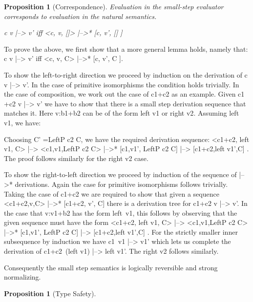 \documentclass[preprint]{sigplanconf}
\newtheorem{proposition}[theorem]{Proposition}
\newenvironment{proof}[1][Proof.]{\begin{trivlist}\item[\hskip \labelsep {\bfseries #1}]}{\end{trivlist}}
\begin{document}
\begin{proposition}[Correspondence]
  Evaluation in the small-step evaluator corresponds to evaluation in
  the natural semantics.

  {{c v |--> v'}} iff {{<c, v, []> |-->* [c, v', [] ]}}
\end{proposition}
\begin{proof}
  To prove the above, we first show that a more general lemma holds,
  namely that: {{c v |--> v'}} iff {{<c, v, C> |-->* [c, v', C ]}}.

  To show the left-to-right direction we proceed by induction on the
  derivation of {{c v |--> v'}}. In the case of primitive isomorphisms
  the condition holds trivially. In the case of composition, we work
  out the case of {{c1+c2}} as an example. Given {{c1 +c2 v |--> v'}}
  we have to show that there is a small step derivation sequence that
  matches it. Here {{v:b1+b2}} can be of the form {{left v1}} or
  {{right v2}}. Assuming {{left v1}}, we have: 


Choosing {{C' =LeftP c2 C}}, we have the required derivation sequence: 
{{ <c1+c2, left v1, C> |--> <c1,v1,LeftP c2 C> |-->* {[c1,v1', LeftP c2 C]} |--> {[c1+c2,left v1',C]} }}. The proof follows similarly for the {{right v2}} case.  

To show the right-to-left direction we proceed by induction of the
sequence of {{|-->*}} derivations. Again the case for primitive
isomorphisms follows trivially. Taking the case of {{c1+c2}} we are
required to show that given a sequence 
{{<c1+c2,v,C> |-->* {[c1+c2, v', C]} }} there is a derivation tree for
{{c1+c2 v |--> v'}}. In the case that {{v:v1+b2}} has the form
{{left~v1}}, this follows by observing that the given sequence must have the form
{{ <c1+c2, left v1, C> |--> <c1,v1,LeftP c2 C> |-->* {[c1,v1', LeftP c2 C]} |--> {[c1+c2,left v1',C]} }}. 
For the strictly smaller inner subsequence by induction we have
{{c1~v1 |--> v1'}} which lets us complete the derivation of
{{c1+c2~(left v1) |--> left v1'}}. The {{right v2}} follows similarly. 

\end{proof}

Consequently the small step semantics is logically reversible and
strong normalizing. 

\begin{proposition}[Type Safety]
  
\end{proposition}
\end{document}
